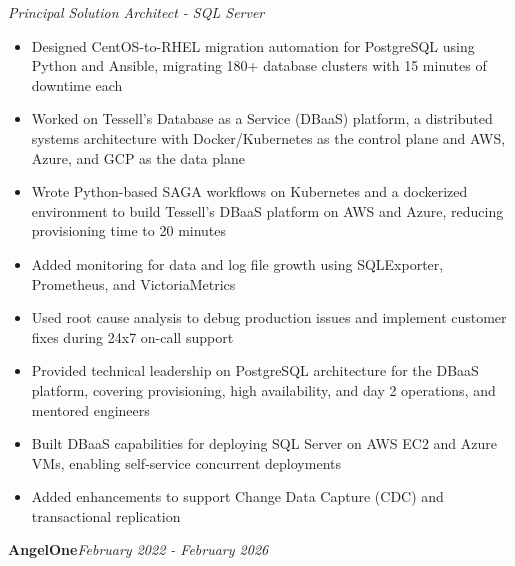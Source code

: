 \documentclass[10pt,a4paper]{article}
\begin{document}
\textit{Principal Solution Architect - SQL Server}\\[-5pt]
\begin{itemize}
  \item Designed CentOS-to-RHEL migration automation for PostgreSQL using Python and Ansible, migrating 180+ database clusters with 15 minutes of downtime each
  \item Worked on Tessell's Database as a Service (DBaaS) platform, a distributed systems architecture with Docker/Kubernetes as the control plane and AWS, Azure, and GCP as the data plane
  \item Wrote Python-based SAGA workflows on Kubernetes and a dockerized environment to build Tessell's DBaaS platform on AWS and Azure, reducing provisioning time to 20 minutes
  \item Added monitoring for data and log file growth using SQLExporter, Prometheus, and VictoriaMetrics
  \item Used root cause analysis to debug production issues and implement customer fixes during 24x7 on-call support
  \item Provided technical leadership on PostgreSQL architecture for the DBaaS platform, covering provisioning, high availability, and day 2 operations, and mentored engineers
  \item Built DBaaS capabilities for deploying SQL Server on AWS EC2 and Azure VMs, enabling self-service concurrent deployments
  \item Added enhancements to support Change Data Capture (CDC) and transactional replication
\end{itemize}
\vspace{14.7pt}
\noindent\textbf{AngelOne}\hfill \textit{February 2022 - February 2026}
\end{document}
